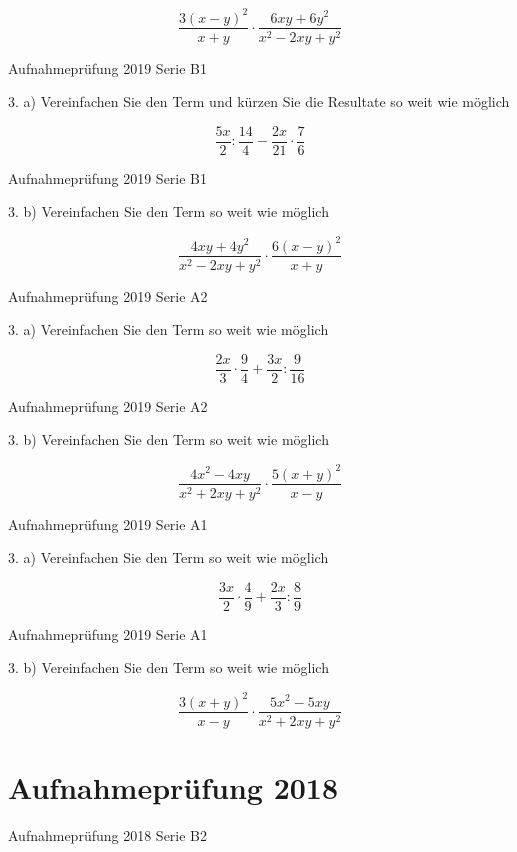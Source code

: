 $$\frac{3(x-y)^2}{x+y} \cdot{} \frac{6xy+6y^2}{x^2-2xy+y^2}$$

Aufnahmeprüfung 2019 Serie B1

3. a) Vereinfachen Sie den Term und kürzen Sie die Resultate so weit wie möglich

$$\frac{5x}{2} : \frac{14}{4} - \frac{2x}{21} \cdot{} \frac{7}{6}$$

Aufnahmeprüfung 2019 Serie B1

3. b) Vereinfachen Sie den Term so weit wie möglich

$$\frac{4xy+4y^2}{x^2-2xy+y^2} \cdot{} \frac{6(x-y)^2}{x+y}$$

Aufnahmeprüfung 2019 Serie A2

3. a) Vereinfachen Sie den Term so weit wie möglich

$$\frac{2x}{3} \cdot{} \frac{9}{4} + \frac{3x}{2} : \frac{9}{16}$$

Aufnahmeprüfung 2019 Serie A2

3. b) Vereinfachen Sie den Term so weit wie möglich

$$\frac{4x^2-4xy}{x^2+2xy+y^2} \cdot{} \frac{5(x+y)^2}{x-y}$$

Aufnahmeprüfung 2019 Serie A1

3. a) Vereinfachen Sie den Term so weit wie möglich

$$\frac{3x}2 \cdot{} \frac49 + \frac{2x}3 : \frac89$$

Aufnahmeprüfung 2019 Serie A1

3. b) Vereinfachen Sie den Term so weit wie möglich

$$\frac{3(x+y)^2}{x-y} \cdot{} \frac{5x^2-5xy}{x^2+2xy+y^2}$$

\section*{Aufnahmeprüfung 2018}
Aufnahmeprüfung 2018 Serie B2

